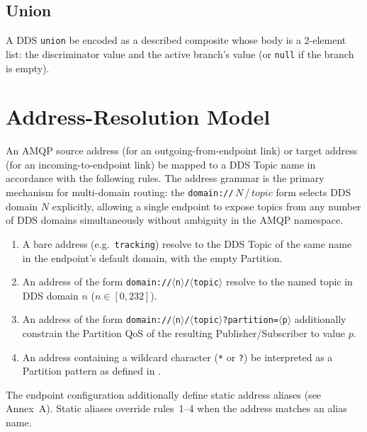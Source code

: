 \documentclass{../styles/zerodds-vendor-spec}
\begin{document}
\subsection{Union}

A DDS \texttt{union}  be encoded as a described
composite whose body is a 2-element list: the discriminator value
and the active branch's value (or \texttt{null} if the branch is
empty).

\section{Address-Resolution Model}\label{sec:pim-address-resolution}

An AMQP source address (for an outgoing-from-endpoint link) or
target address (for an incoming-to-endpoint link)
 be mapped to a DDS Topic name in accordance with the
following rules. The address grammar is the primary mechanism for
multi-domain routing: the \texttt{domain://}\,$N$\,/\,$\textit{topic}$
form selects DDS domain $N$ explicitly, allowing a single
endpoint to expose topics from any number of DDS domains
simultaneously without ambiguity in the AMQP namespace.

\begin{enumerate}
  \item A bare address (e.g.\ \texttt{tracking})  resolve
        to the DDS Topic of the same name in the endpoint's default
        domain, with the empty Partition.
  \item An address of the form
        \texttt{domain://}$\langle$\texttt{n}$\rangle$\texttt{/}$\langle$\texttt{topic}$\rangle$
         resolve to the named topic in DDS domain $n$
        ($n \in [0, 232]$).
  \item An address of the form
        \texttt{domain://}$\langle$\texttt{n}$\rangle$\texttt{/}$\langle$\texttt{topic}$\rangle$\texttt{?partition=}$\langle$\texttt{p}$\rangle$
         additionally constrain the Partition QoS of
        the resulting Publisher/Subscriber to value $p$.
  \item An address containing a wildcard character (\texttt{*} or
        \texttt{?})  be interpreted as a Partition
        pattern as defined in .
\end{enumerate}

The endpoint configuration  additionally define static
address aliases (see Annex~A). Static aliases override rules~1--4
when the address matches an alias name.
\end{document}
